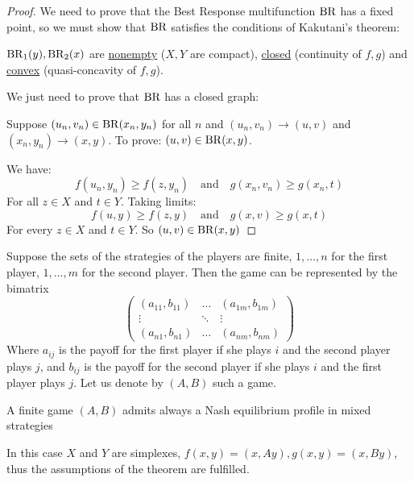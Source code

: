 \documentclass[../main.tex]{subfiles}
\begin{document}
\begin{proof}
    We need to prove that the Best Response multifunction $\operatorname{BR}$ has a fixed point, so we must show that $\operatorname{BR}$ satisfies the conditions of Kakutani's theorem:

    $\operatorname{BR}_1(y), \operatorname{BR}_2(x)$ are \underline{nonempty} ($X,Y$ are compact), \underline{closed} (continuity of $f,g$) and \underline{convex} (quasi-concavity of $f,g$).

    We just need to prove that $\operatorname{BR}$ has a closed graph:

    Suppose $(u_n, v_n) \in \operatorname{BR}(x_n, y_n)$ for all $n$ and $(u_n, v_n) \to (u,v)$ and $(x_n, y_n) \to (x,y)$. To prove: $(u,v) \in \operatorname{BR}(x,y)$.

    We have:
    \[
        f(u_n, y_n) \geq f(z, y_n) \quad \text{and} \quad g(x_n, v_n) \geq g(x_n, t)
    \]
    For all $z \in X$ and $t \in Y$. Taking limits:
    \[
        f(u, y) \geq f(z, y) \quad \text{and} \quad g(x, v) \geq g(x, t)
    \]
    For every $z \in X$ and $t \in Y$. So $(u,v) \in \operatorname{BR}(x,y)$
\end{proof}
Suppose the sets of the strategies of the players are finite, ${1,\ldots,n}$ for the first player, ${1,\ldots,m}$ for the second player. Then the game can be represented by the bimatrix
\[
    \begin{pmatrix}
        (a_{11}, b_{11}) & \ldots & (a_{1m}, b_{1m}) \\
        \vdots           & \ddots & \vdots           \\
        (a_{n1}, b_{n1}) & \ldots & (a_{nm}, b_{nm})
    \end{pmatrix}
\]
Where $a_{ij}$ is the payoff for the first player if she plays $i$ and the second player plays $j$, and $b_{ij}$ is the payoff for the second player if she plays $i$ and the first player plays $j$. Let us denote by $(A,B)$ such a game.
\begin{corollary}
    A finite game $(A,B)$ admits always a Nash equilibrium profile in mixed strategies
\end{corollary}
In this case $X$ and $Y$ are simplexes, $f (x,y) = (x,Ay) , g (x,y) = (x,By)$, thus the assumptions of the theorem are fulfilled.
\end{document}
